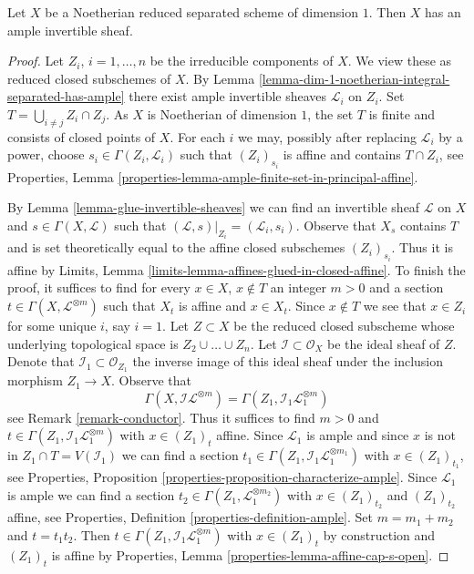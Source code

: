 \begin{lemma}
\label{lemma-dim-1-noetherian-reduced-separated-has-ample}
Let $X$ be a Noetherian reduced separated scheme of dimension $1$.
Then $X$ has an ample invertible sheaf.
\end{lemma}

\begin{proof}
Let $Z_i$, $i = 1, \ldots, n$ be the irreducible components of $X$.
We view these as reduced closed subschemes of $X$.
By Lemma \ref{lemma-dim-1-noetherian-integral-separated-has-ample}
there exist ample invertible sheaves $\mathcal{L}_i$ on $Z_i$.
Set $T = \bigcup_{i \not = j} Z_i \cap Z_j$. As $X$ is Noetherian
of dimension $1$, the set $T$ is finite and consists of closed
points of $X$. For each $i$ we may, possibly after replacing
$\mathcal{L}_i$ by a power, choose $s_i \in \Gamma(Z_i, \mathcal{L}_i)$
such that $(Z_i)_{s_i}$ is affine and contains $T \cap Z_i$, see
Properties, Lemma \ref{properties-lemma-ample-finite-set-in-principal-affine}.

\medskip\noindent
By Lemma \ref{lemma-glue-invertible-sheaves} we can find an invertible sheaf
$\mathcal{L}$ on $X$ and $s \in \Gamma(X, \mathcal{L})$
such that $(\mathcal{L}, s)|_{Z_i} = (\mathcal{L}_i, s_i)$.
Observe that $X_s$ contains $T$ and is set theoretically equal
to the affine closed subschemes $(Z_i)_{s_i}$. Thus it is affine by
Limits, Lemma \ref{limits-lemma-affines-glued-in-closed-affine}.
To finish the proof, it suffices to find for every $x \in X$, $x \not \in T$
an integer $m > 0$ and a section $t \in \Gamma(X, \mathcal{L}^{\otimes m})$
such that $X_t$ is affine and $x \in X_t$. Since $x \not \in T$
we see that $x \in Z_i$ for some unique $i$, say $i = 1$.
Let $Z \subset X$ be the reduced closed subscheme whose underlying
topological space is $Z_2 \cup \ldots \cup Z_n$.
Let $\mathcal{I} \subset \mathcal{O}_X$ be the ideal
sheaf of $Z$. Denote that $\mathcal{I}_1 \subset \mathcal{O}_{Z_1}$
the inverse image of this ideal sheaf under the inclusion
morphism $Z_1 \to X$. Observe that
$$
\Gamma(X, \mathcal{I}\mathcal{L}^{\otimes m}) =
\Gamma(Z_1, \mathcal{I}_1 \mathcal{L}_1^{\otimes m})
$$
see Remark \ref{remark-conductor}. Thus it suffices to find $m > 0$
and $t \in \Gamma(Z_1, \mathcal{I}_1 \mathcal{L}_1^{\otimes m})$
with $x \in (Z_1)_t$ affine. Since $\mathcal{L}_1$ is ample
and since $x$ is not in $Z_1 \cap T = V(\mathcal{I}_1)$
we can find a section
$t_1 \in \Gamma(Z_1, \mathcal{I}_1 \mathcal{L}_1^{\otimes m_1})$
with $x \in (Z_1)_{t_1}$, see Properties, Proposition
\ref{properties-proposition-characterize-ample}.
Since $\mathcal{L}_1$ is ample we can find a section
$t_2 \in \Gamma(Z_1, \mathcal{L}_1^{\otimes m_2})$
with $x \in (Z_1)_{t_2}$ and $(Z_1)_{t_2}$ affine, see
Properties, Definition \ref{properties-definition-ample}.
Set $m = m_1 + m_2$ and $t = t_1 t_2$. Then
$t \in \Gamma(Z_1, \mathcal{I}_1 \mathcal{L}_1^{\otimes m})$
with $x \in (Z_1)_t$ by construction and
$(Z_1)_t$ is affine by Properties, Lemma
\ref{properties-lemma-affine-cap-s-open}.
\end{proof}